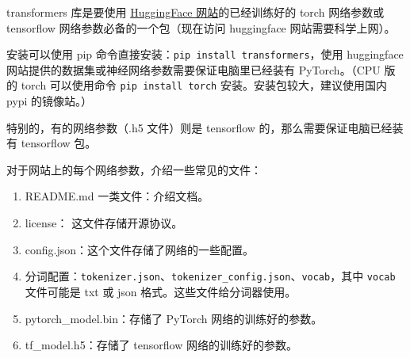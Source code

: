 
\begin{issues}
\issueDraft
\end{issues}

transformers 库是要使用 \href{https://huggingface.co}{HuggingFace 网站}的已经训练好的 torch 网络参数或 tensorflow 网络参数必备的一个包（现在访问 huggingface 网站需要科学上网）。

安装可以使用 pip 命令直接安装：\verb`pip install transformers`，使用 huggingface 网站提供的数据集或神经网络参数需要保证电脑里已经装有 PyTorch。（CPU 版的 torch 可以使用命令 \verb`pip install torch` 安装。安装包较大，建议使用国内 pypi 的镜像站。）

特别的，有的网络参数（.h5 文件）则是 tensorflow 的，那么需要保证电脑已经装有 tensorflow 包。

对于网站上的每个网络参数，介绍一些常见的文件：
\begin{enumerate}
\item README.md 一类文件：介绍文档。
\item license： 这文件存储开源协议。
\item config.json：这个文件存储了网络的一些配置。
\item 分词配置：\verb`tokenizer.json`、\verb`tokenizer_config.json`、\verb`vocab`，其中 \verb`vocab` 文件可能是 txt 或 json 格式。这些文件给分词器使用。
\item pytorch_model.bin：存储了 PyTorch 网络的训练好的参数。
\item tf_model.h5：存储了 tensorflow 网络的训练好的参数。
\end{enumerate}

